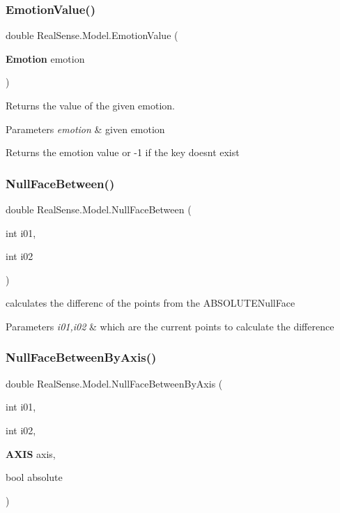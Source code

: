 \subsubsection{Emotion\+Value()}
{\footnotesize\ttfamily double Real\+Sense.\+Model.\+Emotion\+Value (\begin{DoxyParamCaption}\item[{\textbf{ Emotion}}]{emotion }\end{DoxyParamCaption})}

Returns the value of the given emotion.


\begin{DoxyParams}{Parameters}
{\em emotion} & given emotion \\
\hline
\end{DoxyParams}
\begin{DoxyReturn}{Returns}
the emotion value or -\/1 if the key doesn\textquotesingle{}t exist 
\end{DoxyReturn}
\mbox{\label{class_real_sense_1_1_model_a03fd4fa56ceb5cbcebdbebb4b7a78158}} 
\subsubsection{Null\+Face\+Between()}
{\footnotesize\ttfamily double Real\+Sense.\+Model.\+Null\+Face\+Between (\begin{DoxyParamCaption}\item[{int}]{i01,  }\item[{int}]{i02 }\end{DoxyParamCaption})}

calculates the differenc of the points from the A\+B\+S\+O\+L\+U\+T\+E\+Null\+Face 
\begin{DoxyParams}{Parameters}
{\em i01,i02} & which are the current points to calculate the difference \\
\hline
\end{DoxyParams}
\mbox{\label{class_real_sense_1_1_model_aab86ce9f3027b3fca83d11a97353154c}} 
\subsubsection{Null\+Face\+Between\+By\+Axis()}
{\footnotesize\ttfamily double Real\+Sense.\+Model.\+Null\+Face\+Between\+By\+Axis (\begin{DoxyParamCaption}\item[{int}]{i01,  }\item[{int}]{i02,  }\item[{\textbf{ A\+X\+IS}}]{axis,  }\item[{bool}]{absolute }\end{DoxyParamCaption})}

